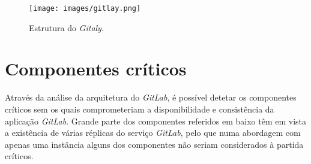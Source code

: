 \documentclass[12pt,a4paper]{article}
\begin{document}
\begin{figure}[H]
  \centering
  \texttt{[image: images/gitlay.png]}
  \caption{Estrutura do \emph{Gitaly}.}
\end{figure}




\newpage
\section{Componentes críticos}

Através da análise da arquitetura do \emph{GitLab}, é possível detetar os componentes críticos sem os quais comprometeriam a disponibilidade e consistência da aplicação \emph{GitLab}. Grande parte dos componentes referidos em baixo têm em vista a existência de várias réplicas do serviço \emph{GitLab}, pelo que numa abordagem com apenas uma instância alguns dos componentes não seriam considerados à partida críticos.
\end{document}
